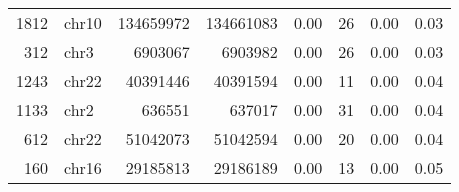 \begin{table}[ht]
\begin{tabular}{rlrrrrrr}
  1812 & chr10 & 134659972 & 134661083 & 0.00 &  26 & 0.00 & 0.03 \\ 
  312 & chr3 & 6903067 & 6903982 & 0.00 &  26 & 0.00 & 0.03 \\ 
  1243 & chr22 & 40391446 & 40391594 & 0.00 &  11 & 0.00 & 0.04 \\ 
  1133 & chr2 & 636551 & 637017 & 0.00 &  31 & 0.00 & 0.04 \\ 
  612 & chr22 & 51042073 & 51042594 & 0.00 &  20 & 0.00 & 0.04 \\ 
  160 & chr16 & 29185813 & 29186189 & 0.00 &  13 & 0.00 & 0.05 \\ 
   \hline
\end{tabular}
\end{table}
